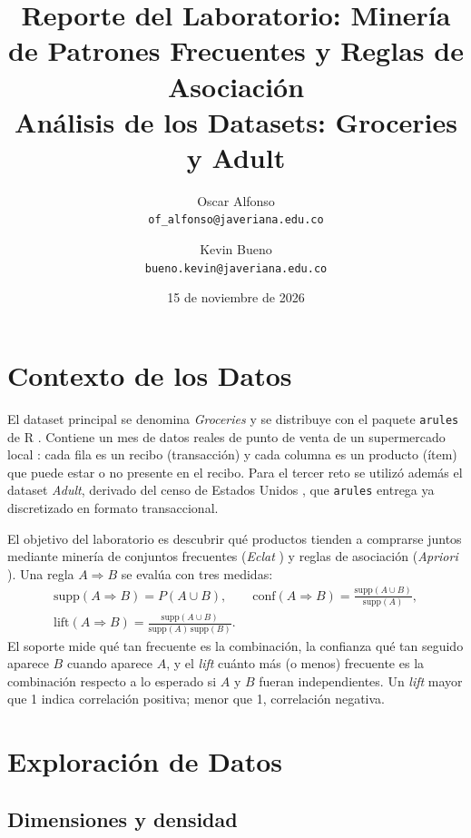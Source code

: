 \documentclass[11pt,a4paper]{article}
\title{Reporte del Laboratorio: Minería de Patrones Frecuentes y Reglas de Asociación\\
\large Análisis de los Datasets: Groceries y Adult}
\author{Oscar Alfonso\\\texttt{of\_alfonso@javeriana.edu.co}
  \and Kevin Bueno\\\texttt{bueno.kevin@javeriana.edu.co}}
\date{15 de noviembre de 2026}
\begin{document}
\maketitle

\section{Contexto de los Datos}

El dataset principal se denomina \emph{Groceries} y se distribuye con el paquete
\texttt{arules} de R \cite{arules2005}. Contiene un mes de datos reales de punto de venta de
un supermercado local \cite{groceries2006}: cada fila es un recibo (transacción) y cada columna
es un producto (ítem) que puede estar o no presente en el recibo. Para el tercer reto se
utilizó además el dataset \emph{Adult}, derivado del censo de Estados Unidos \cite{adult1996},
que \texttt{arules} entrega ya discretizado en formato transaccional.

El objetivo del laboratorio es descubrir qué productos tienden a comprarse juntos mediante
minería de conjuntos frecuentes (\emph{Eclat} \cite{zaki2000}) y reglas de asociación
(\emph{Apriori} \cite{agrawal1994}). Una regla $A \Rightarrow B$ se evalúa con tres medidas:
\begin{equation}
  \begin{gathered}
    \text{supp}(A \Rightarrow B) = P(A \cup B), \qquad
    \text{conf}(A \Rightarrow B) = \frac{\text{supp}(A \cup B)}{\text{supp}(A)}, \\[4pt]
    \text{lift}(A \Rightarrow B) = \frac{\text{supp}(A \cup B)}{\text{supp}(A)\,\text{supp}(B)}.
  \end{gathered}
  \label{eq:medidas}
\end{equation}
El soporte mide qué tan frecuente es la combinación, la confianza qué tan seguido aparece $B$
cuando aparece $A$, y el \emph{lift} cuánto más (o menos) frecuente es la combinación respecto
a lo esperado si $A$ y $B$ fueran independientes. Un \emph{lift} mayor que 1 indica correlación
positiva; menor que 1, correlación negativa.

\section{Exploración de Datos}

\subsection{Dimensiones y densidad}
\end{document}
